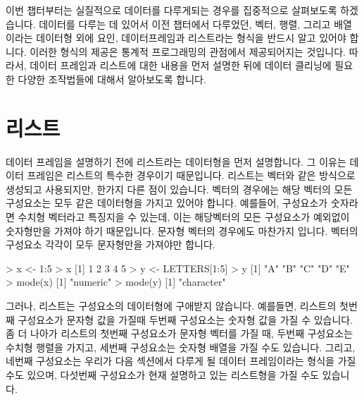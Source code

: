 %
%
%
%
%

이번 챕터부터는 실질적으로 데이터를 다루게되는 경우를 집중적으로 살펴보도록 하겠습니다.
데이터를 다루는 데 있어서 이전 챕터에서 다루었던, 벡터, 행렬, 그리고 배열이라는 데이터형 외에 요인, 데이터프레임과 리스트라는 형식을 반드시 알고 있어야 합니다.
이러한 형식의 제공은 통계적 프로그래밍의 관점에서 제공되어지는 것입니다. 
따라서, 데이터 프레임과 리스트에 대한 내용을 먼저 설명한 뒤에 데이터 클리닝에 필요한 다양한 조작법들에 대해서 알아보도록 합니다.

\section{리스트}
데이터 프레임을 설명하기 전에 리스트라는 데이터형을 먼저 설명합니다.
그 이유는 데이터 프레임은 리스트의 특수한 경우이기 때문입니다.
리스트는 벡터와 같은 방식으로 생성되고 사용되지만, 한가지 다른 점이 있습니다.
벡터의 경우에는 해당 벡터의 모든 구성요소는 모두 같은 데이터형을 가지고 있어야 합니다.
예를들어, 구성요소가 숫자라면 수치형 벡터라고 특징지을 수 있는데, 이는 해당벡터의 모든 구성요소가 예외없이 숫자형만을 가져야 하기 때문입니다.
문자형 벡터의 경우에도 마찬가지 입니다. 
벡터의 구성요소 각각이 모두 문자형만을 가져야만 합니다.
\begin{Schunk}
\begin{Soutput}
> x <- 1:5
> x
[1] 1 2 3 4 5
> y <- LETTERS[1:5]
> y
[1] "A" "B" "C" "D" "E"
> mode(x)
[1] "numeric"
> mode(y)
[1] "character"
\end{Soutput}
\end{Schunk}

그러나, 리스트는 구성요소의 데이터형에 구애받지 않습니다.
예를들면, 리스트의 첫번째 구성요소가 문자형 값을 가질때 두번째 구성요소는 숫자형 값을 가질 수 있습니다.
좀 더 나아가 리스트의 첫번째 구성요소가 문자형 벡터를 가질 때, 두번째 구성요소는 수치형 행렬을 가지고, 세번째 구성요소는 숫자형 배열을 가질 수도 있습니다.
그리고, 네번째 구성요소는 우리가 다음 섹션에서 다루게 될 데이터 프레임이라는 형식을 가질 수도 있으며, 다섯번째 구성요소가 현재 설명하고 있는 리스트형을 가질 수도 있습니다.

